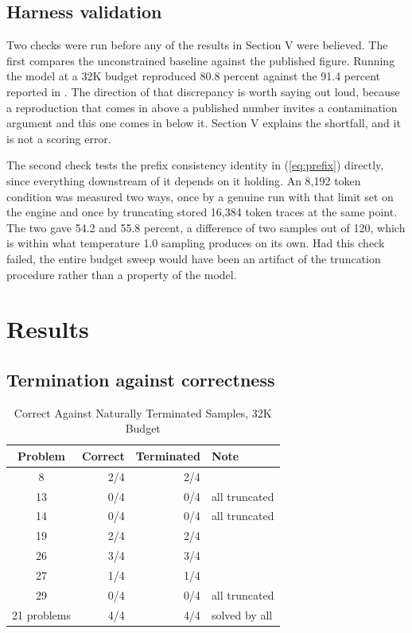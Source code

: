 \documentclass[conference]{IEEEtran}
\begin{document}
\subsection{Harness validation}

Two checks were run before any of the results in Section V were believed. The
first compares the unconstrained baseline against the published figure. Running
the model at a 32K budget reproduced 80.8 percent against the 91.4 percent
reported in \cite{vibethinker}. The direction of that discrepancy is worth saying
out loud, because a reproduction that comes in above a published number invites a
contamination argument and this one comes in below it. Section V explains the
shortfall, and it is not a scoring error.

The second check tests the prefix consistency identity in (\ref{eq:prefix})
directly, since everything downstream of it depends on it holding. An 8,192 token
condition was measured two ways, once by a genuine run with that limit set on the
engine and once by truncating stored 16,384 token traces at the same point. The
two gave 54.2 and 55.8 percent, a difference of two samples out of 120, which is
within what temperature 1.0 sampling produces on its own. Had this check failed,
the entire budget sweep would have been an artifact of the truncation procedure
rather than a property of the model.

\section{Results}

\subsection{Termination against correctness}

\begin{table}[t]
\caption{Correct Against Naturally Terminated Samples, 32K Budget}
\label{tab:decomp}
\centering
\footnotesize
\begin{tabular}{@{}crrl@{}}
\toprule
\textbf{Problem} & \textbf{Correct} & \textbf{Terminated} & \textbf{Note} \\
\midrule
8  & 2/4 & 2/4 & \\
13 & 0/4 & 0/4 & all truncated \\
14 & 0/4 & 0/4 & all truncated \\
19 & 2/4 & 2/4 & \\
26 & 3/4 & 3/4 & \\
27 & 1/4 & 1/4 & \\
29 & 0/4 & 0/4 & all truncated \\
\midrule
21 problems & 4/4 & 4/4 & solved by all \\
\bottomrule
\end{tabular}
\end{table}
\end{document}
